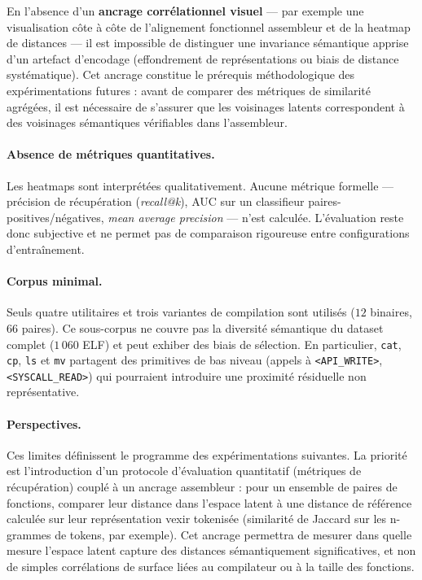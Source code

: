 En l'absence d'un \textbf{ancrage corrélationnel visuel} — par exemple une
visualisation côte à côte de l'alignement fonctionnel assembleur et de la
heatmap de distances — il est impossible de distinguer une invariance
sémantique apprise d'un artefact d'encodage (effondrement de représentations
ou biais de distance systématique). Cet ancrage constitue le prérequis
méthodologique des expérimentations futures : avant de comparer des métriques
de similarité agrégées, il est nécessaire de s'assurer que les voisinages
latents correspondent à des voisinages sémantiques vérifiables dans
l'assembleur.

\paragraph{Absence de métriques quantitatives.}
Les heatmaps sont interprétées qualitativement. Aucune métrique formelle —
précision de récupération (\textit{recall@k}), AUC sur un classifieur
paires-positives/négatives, \textit{mean average precision} — n'est calculée.
L'évaluation reste donc subjective et ne permet pas de comparaison rigoureuse
entre configurations d'entraînement.

\paragraph{Corpus minimal.}
Seuls quatre utilitaires et trois variantes de compilation sont utilisés
($12$ binaires, $66$ paires). Ce sous-corpus ne couvre pas la diversité
sémantique du dataset complet ($1\,060$ ELF) et peut exhiber des biais de
sélection. En particulier, \texttt{cat}, \texttt{cp}, \texttt{ls} et
\texttt{mv} partagent des primitives de bas niveau (appels à
\texttt{<API\_WRITE>}, \texttt{<SYSCALL\_READ>}) qui pourraient introduire une
proximité résiduelle non représentative.

\paragraph{Perspectives.}
Ces limites définissent le programme des expérimentations suivantes. La
priorité est l'introduction d'un protocole d'évaluation quantitatif (métriques
de récupération) couplé à un ancrage assembleur : pour un ensemble de paires
de fonctions, comparer leur distance dans l'espace latent à une distance de
référence calculée sur leur représentation \gls{vexir} tokenisée (similarité
de Jaccard sur les n-grammes de tokens, par exemple). Cet ancrage permettra de
mesurer dans quelle mesure l'espace latent capture des distances sémantiquement
significatives, et non de simples corrélations de surface liées au compilateur
ou à la taille des fonctions.
